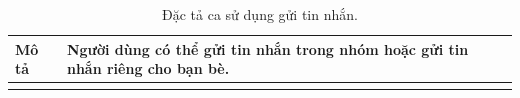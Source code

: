 \begin{longtable}{| p{4cm} | p{\dimexpr\linewidth-4cm-4\tabcolsep} |} %
    \caption{Đặc tả ca sử dụng gửi tin nhắn.} %
    \label{tab:uc_send_message_spec} \\ %

    \hline
    \textbf{Mô tả} & Người dùng có thể gửi tin nhắn trong nhóm hoặc gửi tin nhắn riêng cho bạn bè. \\
    \hline
    \endfirsthead %



    \hline %
    \endlastfoot


\end{longtable}
